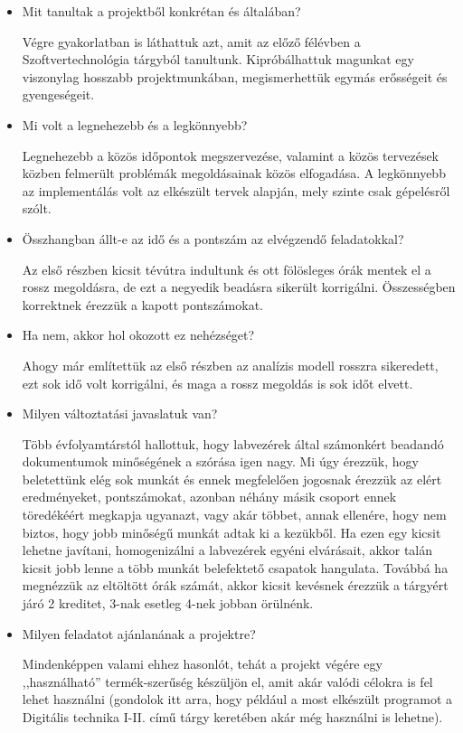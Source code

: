 \begin{itemize}
\item Mit tanultak a projektből konkrétan és általában? \newline

Végre gyakorlatban is láthattuk azt, amit az előző félévben a Szoftvertechnológia tárgyból tanultunk. Kipróbálhattuk magunkat egy viszonylag hosszabb projektmunkában, megismerhettük egymás erősségeit és gyengeségeit. 

\item Mi volt a legnehezebb és a legkönnyebb? \newline

Legnehezebb a közös időpontok megszervezése, valamint a közös tervezések közben felmerült problémák megoldásainak közös elfogadása. A legkönnyebb az implementálás volt az elkészült tervek alapján, mely szinte csak gépelésről szólt.

\item Összhangban állt-e az idő és a pontszám az elvégzendő feladatokkal? \newline

Az első részben kicsit tévútra indultunk és ott fölösleges órák mentek el a rossz megoldásra, de ezt a negyedik beadásra sikerült korrigálni. Összességben korrektnek érezzük a kapott pontszámokat.

\item Ha nem, akkor hol okozott ez nehézséget? \newline

Ahogy már említettük az első részben az analízis modell rosszra sikeredett, ezt sok idő volt korrigálni, és maga a rossz megoldás is sok időt elvett.

\item Milyen változtatási javaslatuk van? \newline

Több évfolyamtárstól hallottuk, hogy labvezérek által számonkért beadandó dokumentumok minőségének a szórása igen nagy. Mi úgy érezzük, hogy beletettünk elég sok munkát és ennek megfelelően jogosnak érezzük az elért eredményeket, pontszámokat, azonban néhány másik csoport ennek töredékéért megkapja ugyanazt, vagy akár többet, annak ellenére, hogy nem biztos, hogy jobb minőségű munkát adtak ki a kezükből. Ha ezen egy kicsit lehetne javítani, homogenizálni a labvezérek egyéni elvárásait, akkor talán kicsit jobb lenne a több munkát belefektető csapatok hangulata. Továbbá ha megnézzük az eltöltött órák számát, akkor kicsit kevésnek érezzük a tárgyért járó 2 kreditet, 3-nak esetleg 4-nek jobban örülnénk.

\item Milyen feladatot ajánlanának a projektre? \newline

Mindenképpen valami ehhez hasonlót, tehát a projekt végére egy ,,használható'' termék-szerűség készüljön el, amit akár valódi célokra is fel lehet használni (gondolok itt arra, hogy például a most elkészült programot a Digitális technika I-II. című tárgy keretében akár még használni is lehetne).

\end{itemize}
